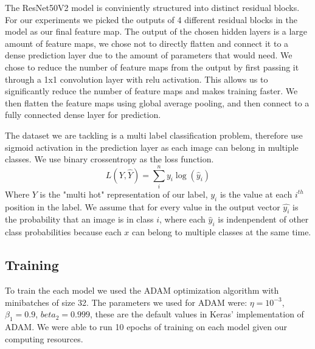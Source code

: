 \documentclass{article}
\begin{document}
The ResNet50V2 model is conviniently structured into distinct residual blocks.
For our experiments we picked the outputs of 4 different residual blocks in the model
as our final feature map. The output of the chosen hidden layers is a large amount of 
feature maps, we chose not to directly flatten and connect it to a dense prediction
layer due to the amount of parameters that would need. We chose to reduce the number of 
feature maps from the output by first passing it through a 1x1 convolution layer with 
relu activation. This allows us to significantly reduce the number of feature maps and makes training faster. 
We then flatten the feature maps using global average pooling, and then connect to a 
fully connected dense layer for prediction. 

The dataset we are tackling is a multi label classification problem, therefore use sigmoid activation
in the prediction layer as each image can belong in multiple classes. We  use binary crossentropy as the loss function. 
\begin{equation}
    L(Y, \hat{Y}) = \sum_i^n y_i\log{(\hat{y}_i)}
\end{equation}
Where $Y$ is the "multi hot" representation of our label, $y_i$
is the value at each $i^{th}$ position in the label.  We assume that for every value in the output vector $\hat{y_i}$ is the probability
that an image is in class $i$, where each $\hat{y}_i$ is indenpendent of other class probabilities because 
each $x$ can belong to multiple classes at the same time. 

\subsection{Training}
To train the each model we used the ADAM optimization algorithm with minibatches of size 32.
The parameters we used for ADAM were: $\eta = 10^{-3}$, $\beta_1 = 0.9$, $beta_2=0.999$, these
are the default values in Keras' implementation of ADAM.
We were able to run 10 epochs of training on each model given our computing resources. 
\end{document}
